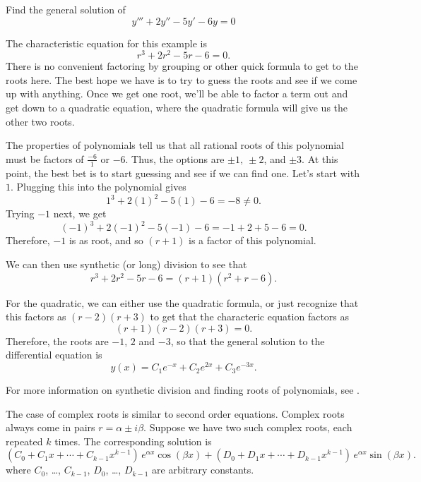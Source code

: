 \begin{example} \label{ex:factorguess}
Find the general solution of 
\begin{equation*}
y''' + 2y'' - 5y' - 6y = 0
\end{equation*}
\end{example}

\begin{exampleSol}
The characteristic equation for this example is
\[ r^3 + 2r^2 - 5r - 6 = 0.\]
There is no convenient factoring by grouping or other quick formula to get to the roots here. The best hope we have is to try to guess the roots and see if we come up with anything. Once we get one root, we'll be able to factor a term out and get down to a quadratic equation, where the quadratic formula will give us the other two roots. 

The properties of polynomials tell us that all rational roots of this polynomial must be factors of $\frac{-6}{1}$ or $-6$. Thus, the options are $\pm 1,\ \pm 2$, and $\pm 3$. At this point, the best bet is to start guessing and see if we can find one. Let's start with $1$. Plugging this into the polynomial gives
\[ 1^3 + 2(1)^2 - 5(1) - 6 = -8 \neq 0. \] Trying $-1$ next, we get
\[ (-1)^3 + 2(-1)^2 - 5(-1) - 6 = -1+2+5-6 = 0. \] Therefore, $-1$ is as root, and so $(r+1)$ is a factor of this polynomial. 

We can then use synthetic (or long) division to see that
\[ r^3 + 2r^2 - 5r - 6 = (r+1)(r^2 + r - 6).\]

For the quadratic, we can either use the quadratic formula, or just recognize that this factors as $(r-2)(r+3)$ to get that the characteric equation factors as 
\[ (r+1)(r-2)(r+3) = 0.\] Therefore, the roots are $-1$, $2$ and $-3$, so that the general solution to the differential equation is
\[ y(x) = C_1 e^{-x} + C_2 e^{2x}+ C_3e^{-3x}. \]
\end{exampleSol}

For more information on synthetic division and finding roots of polynomials, see . 

The case of complex roots is similar
to second order equations.
Complex roots
always come in pairs $r = \alpha \pm i \beta$.  Suppose we have
two such complex roots, each repeated $k$ times.
The corresponding solution is
\begin{equation*}
( C_0 + C_1 x + \cdots + C_{k-1} x^{k-1} ) \, e^{\alpha x} \cos (\beta x)
+
( D_0 + D_1 x + \cdots + D_{k-1} x^{k-1} ) \, e^{\alpha x} \sin (\beta x) .
\end{equation*}
where $C_0$, \ldots, $C_{k-1}$, $D_0$, \ldots, $D_{k-1}$ are arbitrary
constants.

